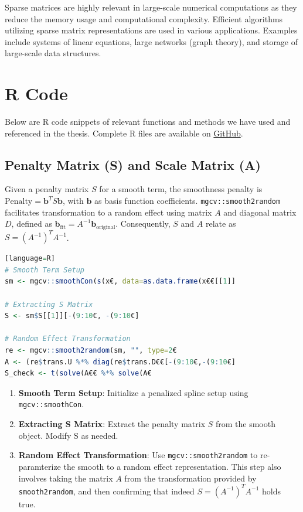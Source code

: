 \documentclass[12pt, twoside,hidelinks]{article}
\theoremstyle{definition}
\numberwithin{equation}{section}
\begin{document}
Sparse matrices are highly relevant in large-scale numerical computations as they reduce the memory usage and computational complexity. Efficient algorithms utilizing sparse matrix representations are used in various applications. Examples include systems of linear equations, large networks (graph theory), and storage of large-scale data structures.


\section{R Code}\label{rcode}
Below are R code snippets of relevant functions and methods we have used and referenced in the thesis. Complete R files are available on \href{https://github.com/AllInCade/MasterProject}{GitHub}.




\subsection{Penalty Matrix (S) and Scale Matrix (A)}
Given a penalty matrix \( S \) for a smooth term, the smoothness penalty is \(\text{Penalty} = \mathbf{b}^T S \mathbf{b}\), with \( \mathbf{b} \) as basis function coefficients. \texttt{mgcv::smooth2random} facilitates transformation to a random effect using matrix \( A \) and diagonal matrix \( D \), defined as \(\mathbf{b}_{\text{fit}} = A^{-1} \mathbf{b}_{\text{original}}\). Consequently, \( S \) and \( A \) relate as \( S = (A^{-1})^T A^{-1} \).

\begin{lstlisting}[language=R][language=R]
# Smooth Term Setup
sm <- mgcv::smoothCon(s(x€, data=as.data.frame(x€€[[1]]

# Extracting S Matrix
S <- sm$S[[1]][-(9:10€, -(9:10€]

# Random Effect Transformation
re <- mgcv::smooth2random(sm, "", type=2€
A <- (re$trans.U %*% diag(re$trans.D€€[-(9:10€,-(9:10€]
S_check <- t(solve(A€€ %*% solve(A€
\end{lstlisting}

\begin{enumerate}
    \item \textbf{Smooth Term Setup}: Initialize a penalized spline setup using \texttt{mgcv::smoothCon}.
    \item \textbf{Extracting S Matrix}: Extract the penalty matrix \( S \) from the smooth object. Modify S as needed.
    \item \textbf{Random Effect Transformation}: Use \texttt{mgcv::smooth2random} to re-paramterize the smooth to a random effect representation. This step also involves taking the matrix \( A \) from the transformation provided by \texttt{smooth2random}, and then confirming that indeed \( S = (A^{-1})^T A^{-1} \) holds true.
\end{enumerate}
\end{document}
